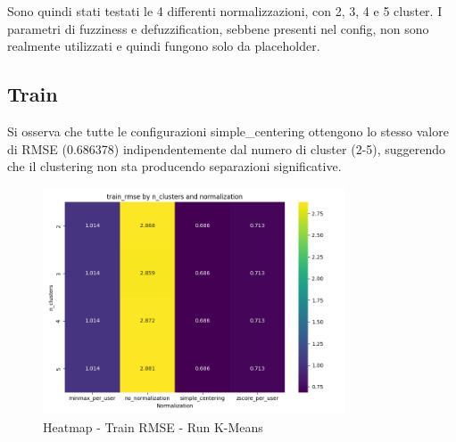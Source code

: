 Sono quindi stati testati le 4 differenti normalizzazioni, con 2, 3, 4 e 5 cluster. I parametri di fuzziness e defuzzification, sebbene presenti nel config, non sono realmente utilizzati e quindi fungono solo da placeholder.

\subsection{Train}

\begin{table}[H]
  \centering
  \caption{Top 5 Configurazioni per Train RMSE - Run K-Means}
\end{table}

Si osserva che tutte le configurazioni simple\_centering ottengono lo stesso valore di RMSE (0.686378) indipendentemente dal numero di cluster (2-5), suggerendo che il clustering non sta producendo separazioni significative.

\begin{figure}[H]
  \centering
  \includegraphics[width=0.8\textwidth]{../output/run_kmeans/images/train/rmse/heatmap_train_rmse.png}
  \caption{Heatmap - Train RMSE - Run K-Means}
  \label{fig:train_rmse_kmeans}
\end{figure}

